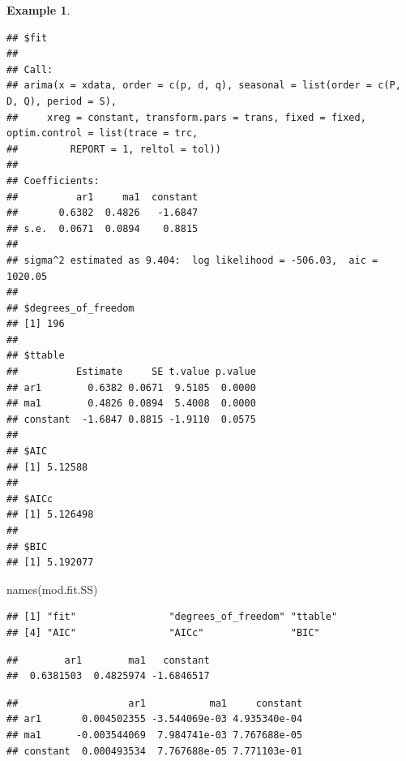 \documentclass[
]{book}
\newenvironment{Shaded}{\begin{snugshade}}{\end{snugshade}}
\newcommand{\FunctionTok}[1]{\textcolor[rgb]{0.00,0.00,0.00}{#1}}
\newcommand{\NormalTok}[1]{#1}
\newcommand{\SpecialCharTok}[1]{\textcolor[rgb]{0.00,0.00,0.00}{#1}}
\theoremstyle{definition}
\theoremstyle{definition}
\newtheorem{example}{Example}[chapter]
\theoremstyle{definition}
\theoremstyle{definition}
\theoremstyle{remark}
\begin{document}
\begin{example}
\begin{verbatim}
## $fit
## 
## Call:
## arima(x = xdata, order = c(p, d, q), seasonal = list(order = c(P, D, Q), period = S), 
##     xreg = constant, transform.pars = trans, fixed = fixed, optim.control = list(trace = trc, 
##         REPORT = 1, reltol = tol))
## 
## Coefficients:
##          ar1     ma1  constant
##       0.6382  0.4826   -1.6847
## s.e.  0.0671  0.0894    0.8815
## 
## sigma^2 estimated as 9.404:  log likelihood = -506.03,  aic = 1020.05
## 
## $degrees_of_freedom
## [1] 196
## 
## $ttable
##          Estimate     SE t.value p.value
## ar1        0.6382 0.0671  9.5105  0.0000
## ma1        0.4826 0.0894  5.4008  0.0000
## constant  -1.6847 0.8815 -1.9110  0.0575
## 
## $AIC
## [1] 5.12588
## 
## $AICc
## [1] 5.126498
## 
## $BIC
## [1] 5.192077
\end{verbatim}

\begin{Shaded}
\begin{Highlighting}[]
\FunctionTok{names}\NormalTok{(mod.fit.SS)}
\end{Highlighting}
\end{Shaded}

\begin{verbatim}
## [1] "fit"                "degrees_of_freedom" "ttable"            
## [4] "AIC"                "AICc"               "BIC"
\end{verbatim}

\begin{Shaded}
\end{Shaded}

\begin{verbatim}
##        ar1        ma1   constant 
##  0.6381503  0.4825974 -1.6846517
\end{verbatim}

\begin{Shaded}
\end{Shaded}

\begin{verbatim}
##                   ar1           ma1     constant
## ar1       0.004502355 -3.544069e-03 4.935340e-04
## ma1      -0.003544069  7.984741e-03 7.767688e-05
## constant  0.000493534  7.767688e-05 7.771103e-01
\end{verbatim}


\end{example}
\end{document}
